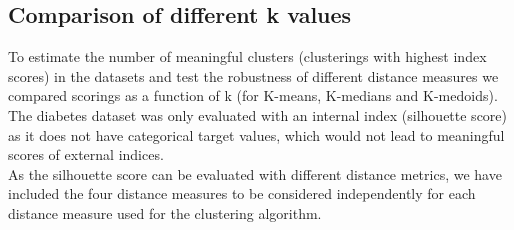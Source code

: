 

\subsection{Comparison of different k values}
\marginnote{\textcolor{blue}{Jonas Elpelt}}
To estimate the number of meaningful clusters (clusterings with highest index scores) in the datasets and test the robustness of different distance measures we compared scorings as a function of k (for K-means, K-medians and K-medoids). The diabetes dataset was only evaluated with an internal index (silhouette score) as it does not have categorical target values, which would not lead to meaningful scores of external indices.  \\
As the silhouette score can be evaluated with different distance metrics, we have included the four distance measures to be considered independently for each distance measure used for the clustering algorithm. 

